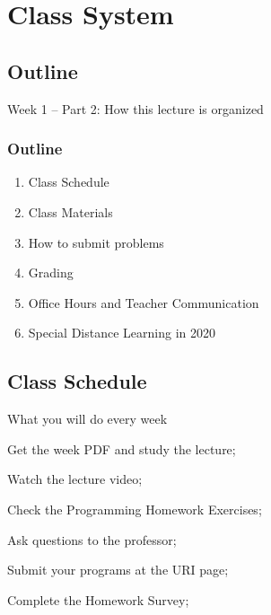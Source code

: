 
\section{Class System}
\subsection{Outline}

\begin{frame}
  \centering
  {\huge
    Week 1 -- Part 2: How this lecture is organized
  }
\end{frame}

\begin{frame}
  \frametitle{Outline}
  \begin{enumerate}
    \item Class Schedule
    \item Class Materials
    \item How to submit problems
    \item Grading
    \item Office Hours and Teacher Communication
    \item \alert{Special} Distance Learning in 2020
  \end{enumerate}
\end{frame}

\subsection{Class Schedule}
\begin{frame}{What you will do every week}
  \begin{description}[(manaba)]
    \item[(manaba)] Get the week PDF and study the lecture;
    \medskip
    \item[(manaba)] Watch the lecture video;
    \medskip
    \item[(URI)] Check the Programming Homework Exercises;
    \medskip
    \item[(TEAMS)] Ask questions to the professor;
    \medskip
    \item[(URI)] Submit your programs at the URI page;
    \medskip
    \item[(manaba)] Complete the Homework Survey;
  \end{description}
\end{frame}

